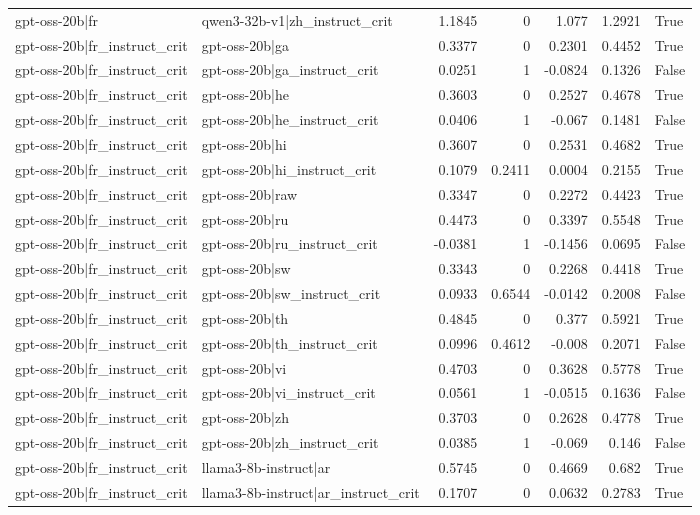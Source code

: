 \begin{table}
\begin{tabular}{l l r r r r l}
gpt-oss-20b|fr & qwen3-32b-v1|zh_instruct_crit & 1.1845 & 0 & 1.077 & 1.2921 & True \\
gpt-oss-20b|fr_instruct_crit & gpt-oss-20b|ga & 0.3377 & 0 & 0.2301 & 0.4452 & True \\
gpt-oss-20b|fr_instruct_crit & gpt-oss-20b|ga_instruct_crit & 0.0251 & 1 & -0.0824 & 0.1326 & False \\
gpt-oss-20b|fr_instruct_crit & gpt-oss-20b|he & 0.3603 & 0 & 0.2527 & 0.4678 & True \\
gpt-oss-20b|fr_instruct_crit & gpt-oss-20b|he_instruct_crit & 0.0406 & 1 & -0.067 & 0.1481 & False \\
gpt-oss-20b|fr_instruct_crit & gpt-oss-20b|hi & 0.3607 & 0 & 0.2531 & 0.4682 & True \\
gpt-oss-20b|fr_instruct_crit & gpt-oss-20b|hi_instruct_crit & 0.1079 & 0.2411 & 0.0004 & 0.2155 & True \\
gpt-oss-20b|fr_instruct_crit & gpt-oss-20b|raw & 0.3347 & 0 & 0.2272 & 0.4423 & True \\
gpt-oss-20b|fr_instruct_crit & gpt-oss-20b|ru & 0.4473 & 0 & 0.3397 & 0.5548 & True \\
gpt-oss-20b|fr_instruct_crit & gpt-oss-20b|ru_instruct_crit & -0.0381 & 1 & -0.1456 & 0.0695 & False \\
gpt-oss-20b|fr_instruct_crit & gpt-oss-20b|sw & 0.3343 & 0 & 0.2268 & 0.4418 & True \\
gpt-oss-20b|fr_instruct_crit & gpt-oss-20b|sw_instruct_crit & 0.0933 & 0.6544 & -0.0142 & 0.2008 & False \\
gpt-oss-20b|fr_instruct_crit & gpt-oss-20b|th & 0.4845 & 0 & 0.377 & 0.5921 & True \\
gpt-oss-20b|fr_instruct_crit & gpt-oss-20b|th_instruct_crit & 0.0996 & 0.4612 & -0.008 & 0.2071 & False \\
gpt-oss-20b|fr_instruct_crit & gpt-oss-20b|vi & 0.4703 & 0 & 0.3628 & 0.5778 & True \\
gpt-oss-20b|fr_instruct_crit & gpt-oss-20b|vi_instruct_crit & 0.0561 & 1 & -0.0515 & 0.1636 & False \\
gpt-oss-20b|fr_instruct_crit & gpt-oss-20b|zh & 0.3703 & 0 & 0.2628 & 0.4778 & True \\
gpt-oss-20b|fr_instruct_crit & gpt-oss-20b|zh_instruct_crit & 0.0385 & 1 & -0.069 & 0.146 & False \\
gpt-oss-20b|fr_instruct_crit & llama3-8b-instruct|ar & 0.5745 & 0 & 0.4669 & 0.682 & True \\
gpt-oss-20b|fr_instruct_crit & llama3-8b-instruct|ar_instruct_crit & 0.1707 & 0 & 0.0632 & 0.2783 & True \\

\end{tabular}
\end{table}
